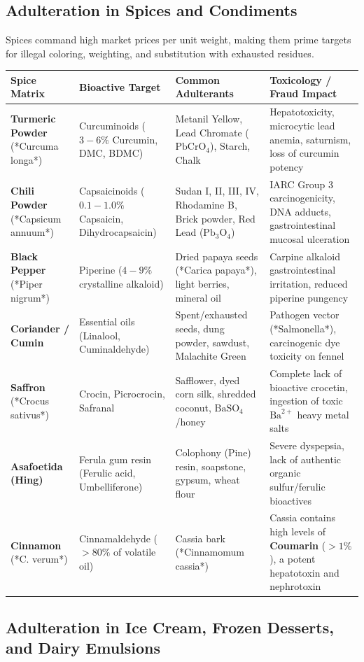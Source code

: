 \documentclass[11pt,a4paper,oneside]{article}
\begin{document}
\subsection{Adulteration in Spices and Condiments}

Spices command high market prices per unit weight, making them prime targets for illegal coloring, weighting, and substitution with exhausted residues.

\begin{center}
\begin{tabular}{@{}p{2.4cm} p{3.6cm} p{4.0cm} p{5.4cm}@{}}
\toprule
\textbf{Spice Matrix} & \textbf{Bioactive Target} & \textbf{Common Adulterants} & \textbf{Toxicology / Fraud Impact} \tabularnewline
\midrule
\textbf{Turmeric Powder} (*Curcuma longa*) & Curcuminoids ($3-6\%$ Curcumin, DMC, BDMC) & Metanil Yellow, Lead Chromate ($\mathrm{PbCrO_4}$), Starch, Chalk & Hepatotoxicity, microcytic lead anemia, saturnism, loss of curcumin potency \tabularnewline
\textbf{Chili Powder} (*Capsicum annuum*) & Capsaicinoids ($0.1-1.0\%$ Capsaicin, Dihydrocapsaicin) & Sudan I, II, III, IV, Rhodamine B, Brick powder, Red Lead ($\mathrm{Pb_3O_4}$) & IARC Group 3 carcinogenicity, DNA adducts, gastrointestinal mucosal ulceration \tabularnewline
\textbf{Black Pepper} (*Piper nigrum*) & Piperine ($4-9\%$ crystalline alkaloid) & Dried papaya seeds (*Carica papaya*), light berries, mineral oil & Carpine alkaloid gastrointestinal irritation, reduced piperine pungency \tabularnewline
\textbf{Coriander / Cumin} & Essential oils (Linalool, Cuminaldehyde) & Spent/exhausted seeds, dung powder, sawdust, Malachite Green & Pathogen vector (*Salmonella*), carcinogenic dye toxicity on fennel \tabularnewline
\textbf{Saffron} (*Crocus sativus*) & Crocin, Picrocrocin, Safranal & Safflower, dyed corn silk, shredded coconut, $\mathrm{BaSO_4}$/honey & Complete lack of bioactive crocetin, ingestion of toxic $\mathrm{Ba}^{2+}$ heavy metal salts \tabularnewline
\textbf{Asafoetida (Hing)} & Ferula gum resin (Ferulic acid, Umbelliferone) & Colophony (Pine) resin, soapstone, gypsum, wheat flour & Severe dyspepsia, lack of authentic organic sulfur/ferulic bioactives \tabularnewline
\textbf{Cinnamon} (*C. verum*) & Cinnamaldehyde ($>80\%$ of volatile oil) & Cassia bark (*Cinnamomum cassia*) & Cassia contains high levels of \textbf{Coumarin} ($>1\%$), a potent hepatotoxin and nephrotoxin \tabularnewline
\bottomrule
\end{tabular}
\end{center}

\subsection{Adulteration in Ice Cream, Frozen Desserts, and Dairy Emulsions}
\end{document}
